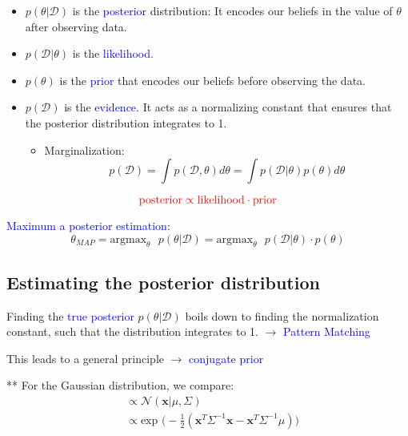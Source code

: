 \documentclass[a4paper,10pt,twoside=true,DIV=10,headsepline,plainheadsepline]{scrartcl}
\begin{document}
		\begin{itemize}
 			\item $p( \theta | \mathcal{D})$ is the \textcolor{blue}{posterior} distribution: It encodes our beliefs in the value of $\theta$ after observing data. 
			\item $p(\mathcal{D}|\theta)$ is the \textcolor{blue}{likelihood}.
			\item $p(\theta)$ is the \textcolor{blue}{prior} that encodes our beliefs before observing the data.
			\item $p(\mathcal{D})$ is the \textcolor{blue}{evidence}. It acts as a normalizing constant that ensures that the posterior distribution integrates to 1. 
				\begin{itemize}
 					\item Marginalization: 
					\begin{equation}
						p(\mathcal{D}) = \int p(\mathcal{D}, \theta) d\theta = \int p(\mathcal{D} | \theta) p(\theta) d\theta 
					\end{equation}
				\end{itemize}
		\end{itemize}

		\begin{equation}
			\textcolor{red}{\textrm{posterior} \propto \textrm{likelihood} \cdot \textrm{prior}}
		\end{equation}
	

	\textcolor{blue}{Maximum a posterior estimation}:
		\begin{equation}
			\theta_{MAP} = \textrm{argmax}_{\theta} \textrm{ } p( \theta | \mathcal{D} ) = \textrm{argmax}_{\theta} \textrm{ } p( \mathcal{D} | \theta ) \cdot p(\theta)
		\end{equation}

	\subsection{Estimating the posterior distribution}
		Finding the \textcolor{blue}{true posterior} $p(\theta | \mathcal{D})$ boils down to finding the normalization constant, such that the distribution integrates to 1. $\rightarrow$ \textcolor{blue}{Pattern Matching}
		\newline

		This leads to a general principle $\rightarrow$ \textcolor{blue}{conjugate prior}
		\newline
	
		** For the Gaussian distribution, we compare:
		\begin{align}
			&\propto \mathcal{N} (\mathbf{x} | \mu, \Sigma) \\
			&\propto \textrm{exp } \Big(-\frac{1}{2} (\mathbf{x}^T \Sigma^{-1} \mathbf{x} - \mathbf{x}^T \Sigma^{-1} \mu)\Big)
		\end{align}
\end{document}
